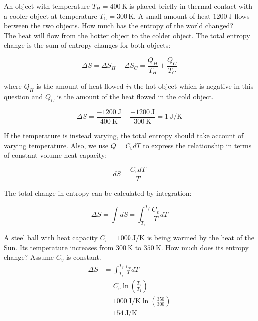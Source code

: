 \begin{texample}
	An object with temperature $T_H=\SI{400}{\kelvin}$ is placed briefly in thermal contact with a cooler object at temperature $T_C=\SI{300}{\kelvin}$. A small amount of heat $\SI{1200}{\joule}$ flows between the two objects. How much has the entropy of the world changed? \\
	
	The heat will flow from the hotter object to the colder object. The total entropy change is the sum of entropy changes for both objects:
	
	\[\Delta S=\Delta S_H+\Delta S_C=\frac{Q_H}{T_H}+\frac{Q_C}{T_C}\]
	
	where $Q_H$ is the amount of heat flowed \textit{in} the hot object which is negative in this question and $Q_C$ is the amount of the heat flowed in the cold object.
	
	\[\Delta S=\frac{-\SI{1200}{\joule}}{\SI{400}{\kelvin}}+\frac{+\SI{1200}{\joule}}{\SI{300}{\kelvin}}=\SI{1}{\joule\per\kelvin}\]
\end{texample}

If the temperature is instead varying, the total entropy should take account of varying temperature. Also, we use $Q=C_vdT$ to express the relationship in terms of constant volume heat capacity:

\[dS=\frac{C_vdT}{T}\]

The total change in entropy can be calculated by integration:

\[\Delta S=\int dS=\int_{T_i}^{T_f} \frac{C_v}{T} dT\]

\begin{texample}
	A steel ball with heat capacity $C_v=\SI{1000}{\joule\per\kelvin}$ is being warmed by the heat of the Sun. Its temperature increases from $\SI{300}{\kelvin}$ to $\SI{350}{\kelvin}$. How much does its entropy change? Assume $C_v$ is constant. \\
	
	\begin{align*}
		\Delta S&=\int_{T_i}^{T_f} \frac{C_v}{T} dT \\
		&=C_v \ln\left( \frac{T_2}{T_1} \right) \\
		&=\SI{1000}{\joule\per\kelvin} \ln\left( \frac{350}{300} \right) \\
		&=\SI{154}{\joule\per\kelvin}
	\end{align*}
\end{texample}

